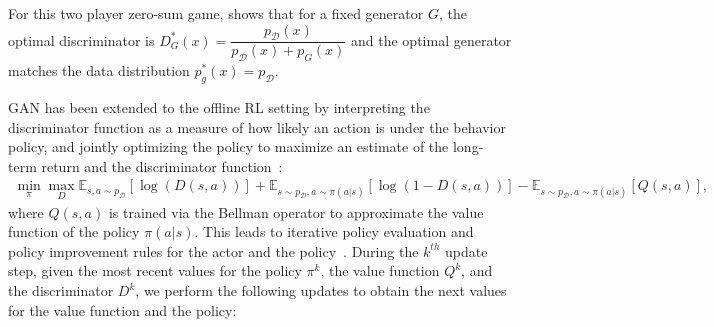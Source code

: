 For this two player zero-sum game, \cite{GoodfellowPMXWOCB14} shows that for a fixed generator $G$, the optimal discriminator is $ D^*_G(x) = \dfrac{ p_{\mathcal{D} } (x) }{ p_{\mathcal{D} } (x) + p_{G }(x) }$ and the optimal generator matches the data distribution $ p^*_g(x) = p_{\mathcal{D}} $.

GAN has been extended to the offline RL setting by interpreting the discriminator function as a measure of how likely an action is under the behavior policy, and jointly optimizing the policy to maximize an estimate of the long-term return and the discriminator function~\cite{brac}: 
\begin{align}
    \min_{\pi} \max_{D}  \mathbb{E}_{ s, a \sim p_{\mathcal{D}}} [\log(D(s,a))] + \mathbb{E}_{ s \sim p_{\mathcal{D}}, a \sim \pi(a|s) } [\log(1 - D(s,a))] - \mathbb{E}_{s \sim p_{\mathcal{D}}, a \sim \pi(a|s)} [ Q(s, a) ], \label{eq:brac}
\end{align}
where $Q(s,a)$ is trained via the Bellman operator to approximate the value function of the policy $\pi(a|s)$.
This leads to iterative policy evaluation and policy improvement rules for the actor and the policy~\cite{brac}. During the $k^{th}$ update step, given the most recent values for the policy $\pi^{k}$, the value function $Q^{k}$, and the discriminator $D^k$, we perform the following updates to obtain the next values for the value function and the policy:
